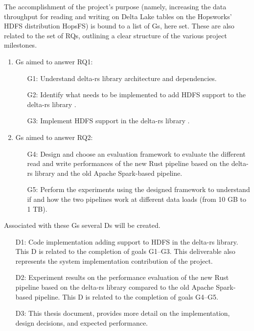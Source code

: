 The accomplishment of the project's purpose (namely, increasing the data throughput for reading and writing on Delta Lake tables on the Hopsworks' \gls{HDFS} distribution HopsFS) is bound to a list of \glspl{G}, here set. These are also related to the set of \glspl{RQ}, outlining a clear structure of the various project milestones.

\begin{enumerate}
    \item \glspl{G} aimed to answer RQ1: 
        \begin{enumerate}
            \item[G1:] Understand delta-rs library \cite{DeltaioDeltars2024} architecture and dependencies.
            \item[G2:] Identify what needs to be implemented to add \gls{HDFS} support to the delta-rs library \cite{DeltaioDeltars2024}.  
            \item[G3:] Implement \gls{HDFS} support in the delta-rs library \cite{DeltaioDeltars2024}.
        \end{enumerate}
    \item \glspl{G} aimed to answer RQ2:
        \begin{enumerate}
            \item[G4:] Design and choose an evaluation framework to evaluate the different read and write performances of the new Rust pipeline based on the delta-rs library \cite{DeltaioDeltars2024} and the old Apache Spark-based pipeline.
            \item[G5:] Perform the experiments using the designed framework to understand if and how the two pipelines work at different data loads (from 10 GB to 1 TB).
        \end{enumerate}
\end{enumerate}

Associated with these \glspl{G} several \glspl{D} will be created. 
\begin{enumerate}
    \item[D1:] Code implementation adding support to \gls{HDFS} in the delta-rs library. This \gls{D} is related to the completion of goals G1--G3. This deliverable also represents the system implementation contribution of the project.
    \item[D2:] Experiment results on the performance evaluation of the new Rust pipeline based on the delta-rs library \cite{DeltaioDeltars2024} compared to the old Apache Spark-based pipeline.
    This \gls{D} is related to the completion of goals G4--G5.
    \item[D3:] This thesis document, provides more detail on the implementation, design decisions, and expected performance.
\end{enumerate}